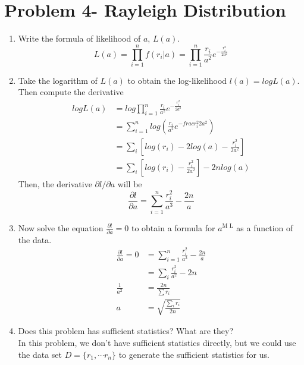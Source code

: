 \documentclass[preprint,12pt]{elsarticle}
\begin{document}
    \section{Problem 4- Rayleigh Distribution}
    \begin{enumerate}
        \item Write the formula of likelihood of $a$, $L(a)$.
        \begin{equation*}
            L(a) = \prod_{i=1}^n f(r_i|a) = \prod_{i=1}^n \frac{r_i}{a^2}e^{-\frac{r_i^2}{2a^2}}
        \end{equation*}

        \item Take the logarithm of $L(a)$ to obtain the log-likelihood 
        $l(a) = log L(a)$. Then compute the derivative
        \begin{align*}
            log L(a)    &= log \prod_{i=1}^n \frac{r_i}{a^2}e^{-\frac{r_i^2}{2a^2}}\\
                        &= \sum_{i=1}^n log(\frac{r_i}{a^2}e^{-frac{r_i^2}{2a^2}})\\
                        &= \sum_{i} [log(r_i) - 2log(a) - \frac{r_i^2}{2a^2}]\\
                        &= \sum_{i} [log(r_i) - \frac{r_i^2}{2a^2}] - 2nlog(a)
        \end{align*}
        Then, the derivative $\partial l/\partial a$ will be
        \begin{equation*}
            \frac{\partial l}{\partial a}  = \sum_{i=1}^n \frac{r_i^2}{a^3} - \frac{2n}{a}
        \end{equation*}

        \item Now solve the equation $\frac{\partial l}{\partial a}=0$ to obtain
        a formula for $a^{\text{M L}}$ as a function of the data.
        \begin{align*}
            \frac{\partial l}{\partial a}=0 &= \sum_{i=1}^n \frac{r_i^2}{a^3} - \frac{2n}{a}\\
                &= \sum_{i} \frac{r_i^2}{a^2} - 2n\\
                \frac{1}{a^2}   &= \frac{2n}{\sum r_i}\\
                a   &= \sqrt{\frac{\sum_{i} r_i}{2n}}
        \end{align*}

        \item Does this problem has sufficient statistics? What are they?\\

        In this problem, we don't have sufficient statistics directly, 
        but we could use the data set $D=\{r_1,\cdots r_n\}$ to generate
        the sufficient statistics for us.
    \end{enumerate}
\end{document}
